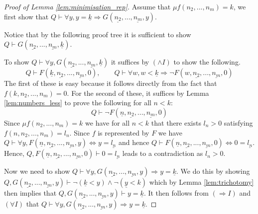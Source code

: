 \documentclass[12pt]{article}
\theoremstyle{plain}
\theoremstyle{definition}
\begin{document}
	\begin{proof}[Proof of Lemma \ref{lem:minimisation_rep}]
		Assume that $\mu f(n_2,...,n_m) = k$, we first show that $Q \vdash \forall y, y = \underline{k} \Longrightarrow G(\underline{n_2},...,\underline{n_m},y)$.
		
		Notice that by the following proof tree it is sufficient to show $Q \vdash G(\underline{n_2},...,\underline{n_m},\underline{k})$.
		\begin{prooftree}
		\end{prooftree}
	To show $Q \vdash \forall y, G(\underline{n_2},...,\underline{n_m},\underline{k})$ it suffices by $(\wedge I)$ to show the following.
	\begin{equation}\label{eq:later_contradictions}
		Q \vdash F(\underline{k}, \underline{n_2},...,\underline{n_m},0),\qquad Q \vdash \forall w, w < \underline{k} \Longrightarrow \neg F(w,\underline{n_2},...,\underline{n_m},0)
	\end{equation}
The first of these is easy because it follows directly from the fact that $f(k,n_2,...,n_m) = 0$. For the second of these, it suffices by Lemma \ref{lem:numbers_less} to prove the following for all $n <k$:
\begin{equation}
	Q \vdash \neg F(\underline{n},\underline{n_2},...,\underline{n_m},0)
\end{equation}
Since $\mu f(n_2,...,n_m) = k$ we have for all $n < k$ that there exists $l_n > 0$ satisfying $f(n,n_2,...,n_m) = l_n$. Since $f$ is represented by $F$ we have $Q \vdash \forall y, F(\underline{n},\underline{n_2},...,\underline{n_m}, y) \Longleftrightarrow y = \underline{l_n}$ and hence $Q \vdash F(\underline{n},\underline{n_2},...,\underline{n_m},0) \Longleftrightarrow 0 = \underline{l_n}$. Hence, $Q,  F(\underline{n},\underline{n_2},...,\underline{n_m},0)\vdash 0 = \underline{l_n}$ leads to a contradiction as $l_n > 0$.

Now we need to show $Q \vdash \forall y, G(\underline{n_2},...,\underline{n_m}, y) \Longrightarrow y = \underline{k}$. We do this by showing $Q, G(\underline{n_2},...,\underline{n_m},y) \vdash \neg(\underline{k} < y) \wedge \neg(\underline{y} < k)$ which by Lemma \ref{lem:trichotomy} then implies that $Q, G(\underline{n_2},...,\underline{n_m},y) \vdash y = \underline{k}$. It then follows from $(\Rightarrow I)$ and $(\forall I)$ that $Q \vdash \forall y, G(\underline{n_2},...,\underline{n_m},y) \Longrightarrow y = \underline{k}$.


\end{proof}
\end{document}
